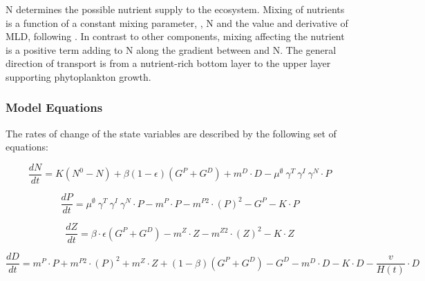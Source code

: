 \documentclass[template.tex]{subfiles}
\begin{document}
\unit{N^\emptyset} determines the possible nutrient supply to the ecosystem. Mixing of nutrients is a function of a constant mixing parameter, , N and the value and derivative of MLD, following \citet{Evans1985ACycles}. In contrast to other components, mixing affecting the nutrient is a positive term adding to N along the gradient between  and N. The general direction of transport is from a nutrient-rich bottom layer to the upper layer supporting phytoplankton growth.

\subsubsection{Model Equations}
The rates of change of the state variables are described by the following set of equations:

\begin{equation}
    \frac{d N}{d t} = 
    K (N^0 - N) %
    + \beta(1 - \epsilon)(G^P + G^D) %
    + m^D \cdot D %
    - \mu^{\emptyset} \ \gamma^{T} \ \gamma^{I} \ \gamma^{N} \cdot P %
\end{equation}

\begin{equation}
    \frac{d P}{d t} =
    \mu^{\emptyset} \ \gamma^{T} \ \gamma^{I} \ \gamma^{N} \cdot P  %
    - m^P \cdot P %
    - m^{P2} \cdot (P)^2 %
    - G^P %
    - K \cdot P %
\end{equation}

\begin{equation}
    \frac{d Z}{d t} =
    \beta \cdot \epsilon(G^P + G^D) %
    - m^Z \cdot Z %
    - m^{Z2} \cdot (Z)^2 %
    - K \cdot Z %
\end{equation}

\begin{equation}
    \frac{d D}{d t} = 
    m^P \cdot P %
    + m^{P2} \cdot (P)^2 %
    + m^Z \cdot Z %
    + (1 - \beta)(G^P + G^D) %
    - G^D %
    - m^D \cdot D %
    - K \cdot D %
    - \frac{v}{H(t)} \cdot D %
\end{equation}
\end{document}
